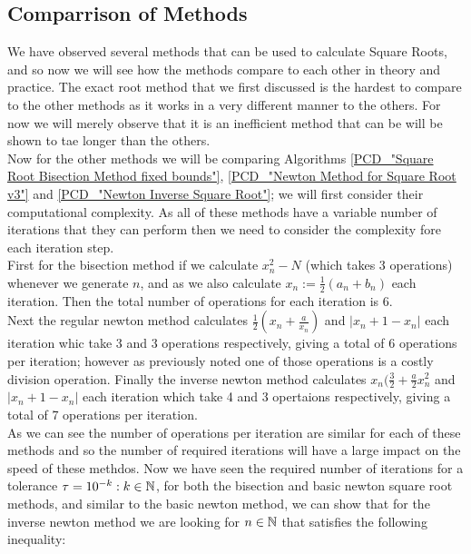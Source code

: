 \subsection{Comparrison of Methods}

We have observed several methods that can be used to calculate Square Roots, and so now we will see how the methods compare to each other in theory and practice. The exact root method that we first discussed is the hardest to compare to the other methods as it works in a very different manner to the others. For now we will merely observe that it is an inefficient method that can be will be shown to tae longer than the others.\\

Now for the other methods we will be comparing Algorithms \ref{PCD_"Square Root Bisection Method fixed bounds"}, \ref{PCD_"Newton Method for Square Root v3"} and \ref{PCD_"Newton Inverse Square Root"}; we will first consider their computational complexity. As all of these methods have a variable number of iterations that they can perform then we need to consider the complexity fore each iteration step.\\

First for the bisection method if we calculate \(x_n^2 - N\) (which takes 3 operations) whenever we generate \(n\), and as we also calculate \(x_n := \tfrac{1}{2}(a_n + b_n)\) each iteration. Then the total number of operations for each iteration is 6.\\

Next the regular newton method calculates \(\tfrac{1}{2}(x_n + \tfrac{a}{x_n})\) and \(|x_n+1 - x_n|\) each iteration whic take 3 and 3 operations respectively, giving a total of 6 operations per iteration; however as previously noted one of those operations is a costly division operation. Finally the inverse newton method calculates \(x_n(\tfrac{3}{2} + \tfrac{a}{2}x_n^2\) and \(|x_n+1 - x_n|\) each iteration which take 4 and 3 opertaions respectively, giving a total of 7 operations per iteration.\\

As we can see the number of operations per iteration are similar for each of these methods and so the number of required iterations will have a large impact on the speed of these methdos. Now we have seen the required number of iterations for a tolerance \(\tau = 10^{-k} : k \in \mathbb{N}\), for both the bisection and basic newton square root methods, and similar to the basic newton method, we can show that for the inverse newton method we are looking for \(n \in \mathbb{N}\) that satisfies the following inequality:

